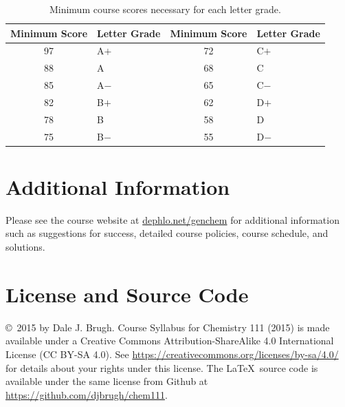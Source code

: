 \documentclass[letterpaper,oneside,onecolumn,11pt,article]{memoir}
\begin{document}
\begin{table}[h]
\caption{\sffamily Minimum course scores necessary for each letter grade.}
\label{tab:lettergrades}
\begin{tabular}{cl||cl} \toprule
\textbf{Minimum Score} & \textbf{Letter Grade} & \textbf{Minimum Score} & \textbf{Letter Grade} \\ \hline
97 & \hspace{0.3in}A$+$ & 72 & \hspace{0.3in}C$+$ \\
88 & \hspace{0.3in}A & 68 & \hspace{0.3in}C \\
85 & \hspace{0.3in}A$-$ & 65 & \hspace{0.3in}C$-$ \\
82 & \hspace{0.3in}B$+$ & 62 & \hspace{0.3in}D$+$ \\
78 & \hspace{0.3in}B & 58 & \hspace{0.3in}D \\
75 & \hspace{0.3in}B$-$ & 55 & \hspace{0.3in}D$-$ \\
\bottomrule
\end{tabular}
\end{table}
%
%
\section{Additional Information}
Please see the course website at \href{http://dephlo.net/genchem}{dephlo.net/genchem} for additional information such as suggestions for success, detailed course policies, course schedule, and solutions. 
%
%
\section{License and Source Code}
\copyright\ 2015 by Dale J. Brugh. Course Syllabus for Chemistry 111 (2015) is made available under a Creative Commons Attribution-ShareAlike 4.0 International License (CC BY-SA 4.0). See \href{https://creativecommons.org/licenses/by-sa/4.0/}{https://creativecommons.org/licenses/by-sa/4.0/} for details about your rights under this license. The \LaTeX\ source code is available under the same license from Github at \href{https://github.com/djbrugh/chem111}{https://github.com/djbrugh/chem111}. 
%
%
\end{document}
